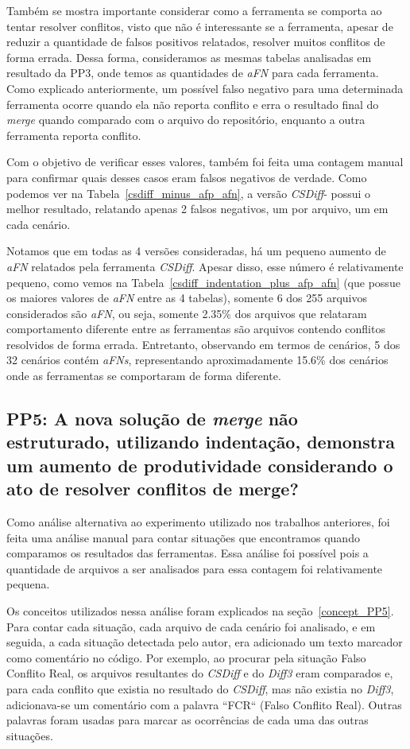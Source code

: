 Também se mostra importante considerar como a ferramenta se comporta ao tentar
resolver conflitos, visto que não é interessante se a ferramenta, apesar de
reduzir a quantidade de falsos positivos relatados, resolver muitos conflitos
de forma errada. Dessa forma, consideramos as mesmas tabelas analisadas em
resultado da PP3, onde temos as quantidades de \emph{aFN} para cada ferramenta.
Como explicado anteriormente, um possível falso negativo para uma determinada
ferramenta ocorre quando ela não reporta conflito e erra o resultado final do
\emph{merge} quando comparado com o arquivo do repositório, enquanto a outra
ferramenta reporta conflito.

Com o objetivo de verificar esses valores, também foi feita uma contagem manual
para confirmar quais desses casos eram falsos negativos de verdade. Como podemos ver na
Tabela~\ref{csdiff_minus_afp_afn}, a versão \emph{CSDiff}- possui o melhor
resultado, relatando apenas 2 falsos negativos, um por arquivo, um em cada
cenário.

Notamos que em todas as 4 versões consideradas, há um pequeno aumento de
\emph{aFN} relatados pela ferramenta \emph{CSDiff}. Apesar disso, esse número é
relativamente pequeno, como vemos na Tabela~\ref{csdiff_indentation_plus_afp_afn} (que possue os maiores valores de
\emph{aFN} entre as 4 tabelas), somente 6 dos 255 arquivos considerados são
\emph{aFN}, ou seja, somente 2.35\% dos arquivos que relataram
comportamento diferente entre as ferramentas são arquivos contendo conflitos
resolvidos de forma errada. Entretanto, observando em termos de cenários, 5 dos
32 cenários contém \emph{aFNs}, representando aproximadamente 15.6\% dos cenários
onde as ferramentas se comportaram de forma diferente.

\subsection{PP5: A nova solução de \emph{merge} não estruturado, utilizando indentação,
	demonstra um aumento de produtividade considerando o ato de resolver conflitos de merge?}

Como análise alternativa ao experimento utilizado nos trabalhos anteriores, foi
feita uma análise manual para contar situações que encontramos quando
comparamos os resultados das ferramentas. Essa análise foi possível pois a
quantidade de arquivos a ser analisados para essa contagem foi relativamente
pequena.

Os conceitos utilizados nessa análise foram explicados na
seção~\ref{concept_PP5}. Para contar cada situação, cada arquivo de cada
cenário foi analisado, e em seguida, a cada situação detectada pelo autor, era
adicionado um texto marcador como comentário no código. Por exemplo, ao
procurar pela situação Falso Conflito Real, os arquivos resultantes do
\emph{CSDiff} e do \emph{Diff3} eram comparados e, para cada conflito que
existia no resultado do \emph{CSDiff}, mas não existia no \emph{Diff3},
adicionava-se um comentário com a palavra ``FCR`` (Falso Conflito Real). Outras
palavras foram usadas para marcar as ocorrências de cada uma das outras
situações.

